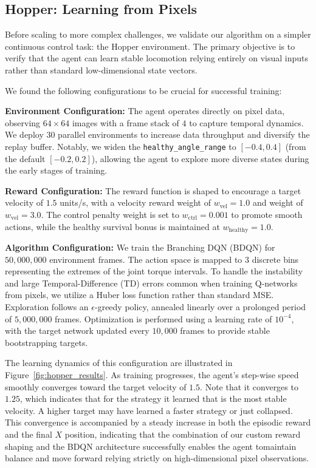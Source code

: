 \subsection{Hopper: Learning from Pixels}
\label{sec:hopper_results}

Before scaling to more complex challenges, we validate our algorithm on a simpler continuous control task: the Hopper environment. The primary objective is to verify that the agent can learn stable locomotion relying entirely on visual inputs rather than standard low-dimensional state vectors. 

We found the following configurations to be crucial for successful training:

\textbf{Environment Configuration:} 
The agent operates directly on pixel data, observing $64 \times 64$ images with a frame stack of $4$ to capture temporal dynamics. We deploy $30$ parallel environments to increase data throughput and diversify the replay buffer. Notably, we widen the \texttt{healthy\_angle\_range} to $[-0.4, 0.4]$ (from the default $[-0.2, 0.2]$), allowing the agent to explore more diverse states during the early stages of training.

\textbf{Reward Configuration:}
The reward function is shaped to encourage a target velocity of $1.5$ units/s, with a velocity reward weight of $w_{\text{vel}} = 1.0$ and weight of $w_{\text{vel}} = 3.0$. The control penalty weight is set to $w_{\text{ctrl}} = 0.001$ to promote smooth actions, while the healthy survival bonus is maintained at $w_{\text{healthy}} = 1.0$.

\textbf{Algorithm Configuration:} 
We train the Branching DQN (BDQN) for $50,000,000$ environment frames. The action space is mapped to $3$ discrete bins representing the extremes of the joint torque intervals. To handle the instability and large Temporal-Difference (TD) errors common when training Q-networks from pixels, we utilize a Huber loss function rather than standard MSE. Exploration follows an $\epsilon$-greedy policy, annealed linearly over a prolonged period of $5,000,000$ frames. Optimization is performed using a learning rate of $10^{-4}$, with the target network updated every $10,000$ frames to provide stable bootstrapping targets.

The learning dynamics of this configuration are illustrated in Figure~\ref{fig:hopper_results}. As training progresses, the agent's step-wise speed smoothly converges toward the target velocity of $1.5$. Note that it converges to $1.25$, which indicates that for the strategy it learned that is the most stable velocity. A higher target may have learned a faster strategy or just collapsed. This convergence is accompanied by a steady increase in both the episodic reward and the final $X$ position, indicating that the combination of our custom reward shaping and the BDQN architecture successfully enables the agent tomaintain balance and move forward relying strictly on high-dimensional pixel observations.

